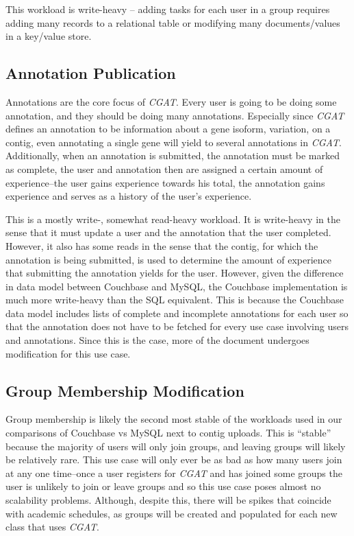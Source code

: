 \documentclass[10pt, conference, compsocconf]{IEEEtran}
\begin{document}
This workload is write-heavy -- adding tasks for each user in a group requires
adding many records to a relational table or modifying many documents/values
in a key/value store.

\subsection{Annotation Publication}
Annotations are the core focus of \textit{CGAT}. Every user is going to be
doing some annotation, and they should be doing many annotations. Especially
since \textit{CGAT} defines an annotation to be information about a gene
isoform, variation, on a contig, even annotating a single gene will yield to several
annotations in \textit{CGAT}. Additionally, when an annotation is submitted,
the annotation must be marked as complete, the user and annotation then are
assigned a certain amount of experience--the user gains experience towards
his total, the annotation gains experience and serves as a history of the
user's experience.

This is a mostly write-, somewhat read-heavy workload. It is write-heavy in the
sense that it must update a user and the annotation that the user completed.
However, it also has some reads in the sense that the contig, for which the
annotation is being submitted, is used to determine the amount of experience
that submitting the annotation yields for the user. However, given the
difference in data model between Couchbase and MySQL, the Couchbase
implementation is much more write-heavy than the SQL equivalent. This is
because the Couchbase data model includes lists of complete and incomplete
annotations for each user so that the annotation does not have to be fetched
for every use case involving users and annotations. Since this is the case,
more of the document undergoes modification for this use case.

\subsection{Group Membership Modification}
Group membership is likely the second most stable of the workloads used in our
comparisons of Couchbase vs MySQL next to contig uploads. This is ``stable''
because the majority of users will only join groups, and leaving groups will
likely be relatively rare. This use case will only ever be as bad as how many
users join at any one time--once a user registers for \textit{CGAT} and has
joined some groups the user is unlikely to join or leave groups and so this use
case poses almost no scalability problems. Although, despite this, there will
be spikes that coincide with academic schedules, as groups will be created and
populated for each new class that uses \textit{CGAT}.
\end{document}
